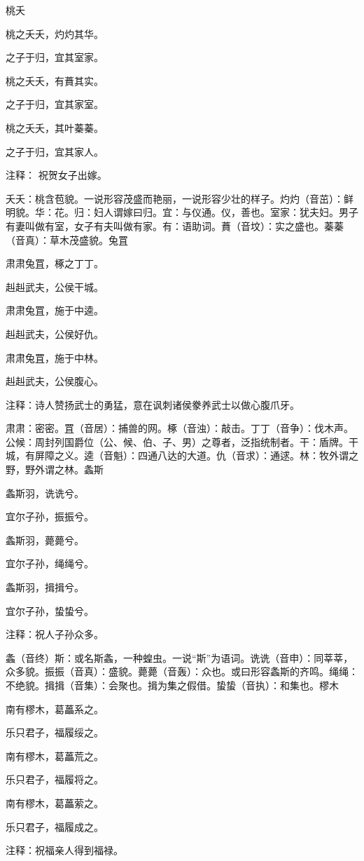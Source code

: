 \documentclass[12pt,UTF8]{ctexbook}
\begin{document}
桃夭

桃之夭夭，灼灼其华。

之子于归，宜其室家。

桃之夭夭，有蕡其实。

之子于归，宜其家室。

桃之夭夭，其叶蓁蓁。

之子于归，宜其家人。

注释： 祝贺女子出嫁。

夭夭：桃含苞貌。一说形容茂盛而艳丽，一说形容少壮的样子。灼灼（音茁）：鲜明貌。华：花。归：妇人谓嫁曰归。宜：与仪通。仪，善也。室家：犹夫妇。男子有妻叫做有室，女子有夫叫做有家。有：语助词。蕡（音坟）：实之盛也。蓁蓁（音真）：草木茂盛貌。兔罝

肃肃兔罝，椓之丁丁。

赳赳武夫，公侯干城。

肃肃兔罝，施于中逵。

赳赳武夫，公侯好仇。

肃肃兔罝，施于中林。

赳赳武夫，公侯腹心。

注释：诗人赞扬武士的勇猛，意在讽刺诸侯豢养武士以做心腹爪牙。

肃肃：密密。罝（音居）：捕兽的网。椓（音浊）：敲击。丁丁（音争）：伐木声。公候：周封列国爵位（公、候、伯、子、男）之尊者，泛指统制者。干：盾牌。干城，有屏障之义。逵（音魁）：四通八达的大道。仇（音求）：通逑。林：牧外谓之野，野外谓之林。螽斯

螽斯羽，诜诜兮。

宜尔子孙，振振兮。

螽斯羽，薨薨兮。

宜尔子孙，绳绳兮。

螽斯羽，揖揖兮。

宜尔子孙，蛰蛰兮。

注释：祝人子孙众多。

螽（音终）斯：或名斯螽，一种蝗虫。一说“斯”为语词。诜诜（音申）：同莘莘，众多貌。振振（音真）：盛貌。薨薨（音轰）：众也。或曰形容螽斯的齐鸣。绳绳：不绝貌。揖揖（音集）：会聚也。揖为集之假借。蛰蛰（音执）：和集也。樛木

南有樛木，葛藟系之。

乐只君子，福履绥之。

南有樛木，葛藟荒之。

乐只君子，福履将之。

南有樛木，葛藟萦之。

乐只君子，福履成之。

注释：祝福亲人得到福禄。
\end{document}
